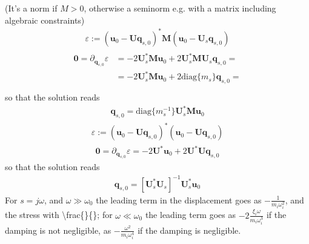 \documentclass[letterpaper,10pt,english]{jupyterBook}
\begin{document}
\sphinxAtStartPar
{} (It’s a norm if \(M > 0\), otherwise a semi\sphinxhyphen{}norm \sphinxhyphen{} e.g. with a matrix including algebraic constraints)
\begin{equation*}
\begin{split}\varepsilon := \left( \mathbf{u}_0 - \mathbf{U} \mathbf{q}_{s,0} \right)^* \mathbf{M} \left( \mathbf{u}_0 - \mathbf{U}_s \mathbf{q}_{s,0} \right)\end{split}
\end{equation*}\begin{equation*}
\begin{split}\begin{aligned}
 \mathbf{0} = \partial_{\mathbf{q}_{s,0}} \varepsilon 
 & = - 2 \mathbf{U}_s^* \mathbf{M} \mathbf{u}_0 + 2 \mathbf{U}_s^* \mathbf{M} \mathbf{U}_s \mathbf{q}_{s,0} = \\
 & = - 2 \mathbf{U}_s^* \mathbf{M} \mathbf{u}_0 + 2 \text{diag}\{ m_s \} \mathbf{q}_{s,0} = \\
\end{aligned}\end{split}
\end{equation*}
\sphinxAtStartPar
so that the solution reads
\begin{equation*}
\begin{split}\mathbf{q}_{s,0} = \text{diag} \{ m_s^{-1} \} \mathbf{U}_s^* \mathbf{M} \mathbf{u}_0\end{split}
\end{equation*}
\sphinxAtStartPar
{}
\begin{equation*}
\begin{split}\varepsilon := \left( \mathbf{u}_0 - \mathbf{U} \mathbf{q}_{s,0} \right)^* \left( \mathbf{u}_0 - \mathbf{U} \mathbf{q}_{s,0} \right)\end{split}
\end{equation*}\begin{equation*}
\begin{split}\mathbf{0} = \partial_{\mathbf{q}_{s,0}} \varepsilon = - 2 \mathbf{U}^* \mathbf{u}_0 + 2 \mathbf{U}^* \mathbf{U} \mathbf{q}_{s,0} \end{split}
\end{equation*}
\sphinxAtStartPar
so that the solution reads
\begin{equation*}
\begin{split}\mathbf{q}_{s,0} = \left[ \mathbf{U}_s^* \mathbf{U}_s \right]^{-1} \mathbf{U}_s^* \mathbf{u}_0\end{split}
\end{equation*}
\sphinxAtStartPar
{} For \(s = j\omega\), and \(\omega \gg \omega_0\) the leading term in the displacement goes as \(-\frac{1}{m_i \omega_i^2}\), and the stress with \textbackslash{}frac\{\}\{\}; for \(\omega \ll \omega_0\) the leading term goes as \(-2 \frac{\xi_i \omega}{m_i \omega_i^3}\) if the damping is not negligible, as \(-\frac{\omega^2}{m_i \omega_i^4}\) if the damping is negligible.
\end{document}
